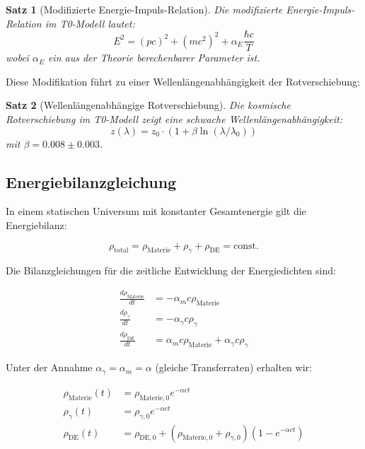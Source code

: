 \documentclass[a4paper,12pt]{article}
\newtheorem{theorem}{Satz}[section]
\theoremstyle{definition}
\theoremstyle{remark}
\begin{document}
	\begin{theorem}[Modifizierte Energie-Impuls-Relation]
		Die modifizierte Energie-Impuls-Relation im T0-Modell lautet:
		\begin{equation}
			E^2 = (pc)^2 + (mc^2)^2 + \alpha_E\frac{\hbar c}{T}
		\end{equation}
		wobei \(\alpha_E\) ein aus der Theorie berechenbarer Parameter ist.
	\end{theorem}
	
	Diese Modifikation führt zu einer Wellenlängenabhängigkeit der Rotverschiebung:
	
	\begin{theorem}[Wellenlängenabhängige Rotverschiebung]
		Die kosmische Rotverschiebung im T0-Modell zeigt eine schwache Wellenlängenabhängigkeit:
		\begin{equation}
			z(\lambda) = z_0 \cdot (1 + \beta\ln(\lambda/\lambda_0))
		\end{equation}
		mit \(\beta = 0.008 \pm 0.003\).
	\end{theorem}
	
	\subsection{Energiebilanzgleichung}
	
	In einem statischen Universum mit konstanter Gesamtenergie gilt die Energiebilanz:
	
	\begin{equation}
		\rho_{\text{total}} = \rho_{\text{Materie}} + \rho_{\gamma} + \rho_{\text{DE}} = \text{const.}
	\end{equation}
	
	Die Bilanzgleichungen für die zeitliche Entwicklung der Energiedichten sind:
	
	\begin{align}
		\frac{d\rho_{\text{Materie}}}{dt} &= -\alpha_{m} c \rho_{\text{Materie}} \\
		\frac{d\rho_{\gamma}}{dt} &= -\alpha_{\gamma} c \rho_{\gamma} \\
		\frac{d\rho_{\text{DE}}}{dt} &= \alpha_{m} c \rho_{\text{Materie}} + \alpha_{\gamma} c \rho_{\gamma}
	\end{align}
	
	Unter der Annahme \(\alpha_{\gamma} = \alpha_{m} = \alpha\) (gleiche Transferraten) erhalten wir:
	
	\begin{align}
		\rho_{\text{Materie}}(t) &= \rho_{\text{Materie},0} e^{-\alpha c t} \\
		\rho_{\gamma}(t) &= \rho_{\gamma,0} e^{-\alpha c t} \\
		\rho_{\text{DE}}(t) &= \rho_{\text{DE},0} + (\rho_{\text{Materie},0} + \rho_{\gamma,0})(1 - e^{-\alpha c t})
	\end{align}
	
\end{document}
